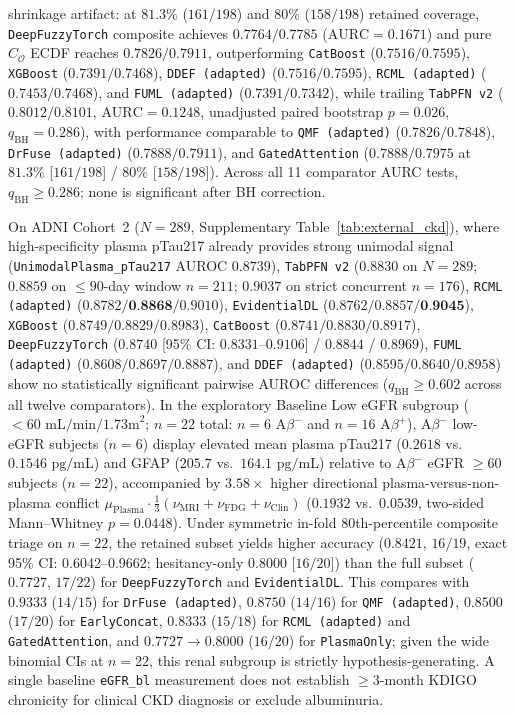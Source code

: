 \documentclass[10pt,twocolumn]{article}
\begin{document}
shrinkage artifact: at $81.3\%$ ($161/198$) and $80\%$ ($158/198$) retained coverage,
\texttt{DeepFuzzyTorch} composite achieves $0.7764 / 0.7785$ ($\text{AURC}=0.1671$) and pure
$C_{\mathcal{O}}$ ECDF reaches $0.7826 / 0.7911$, outperforming \texttt{CatBoost} ($0.7516 /
0.7595$), \texttt{XGBoost} ($0.7391 / 0.7468$), \texttt{DDEF (adapted)} ($0.7516 / 0.7595$),
\texttt{RCML (adapted)} ($0.7453 / 0.7468$), and \texttt{FUML (adapted)} ($0.7391 / 0.7342$),
while trailing
\texttt{TabPFN~v2} ($0.8012 / 0.8101$, $\text{AURC}=0.1248$, unadjusted paired bootstrap
$p=0.026$,
$q_{\text{BH}}=0.286$), with performance comparable to \texttt{QMF (adapted)}
($0.7826 / 0.7848$), \texttt{DrFuse (adapted)} ($0.7888 / 0.7911$), and
\texttt{GatedAttention} ($0.7888 / 0.7975$ at $81.3\%$ [$161/198$] / $80\%$ [$158/198$]).
Across all 11
comparator AURC tests, $q_{\text{BH}}\ge0.286$; none is significant after BH correction.

On ADNI Cohort~2 ($N=289$, Supplementary Table~\ref{tab:external_ckd}), where high-specificity
plasma pTau217
already provides strong unimodal signal (\texttt{UnimodalPlasma\_pTau217} AUROC $0.8739$),
\texttt{TabPFN~v2} ($0.8830$ on $N=289$; $0.8859$ on $\le 90$-day window $n=211$; $0.9037$ on
strict concurrent $n=176$), \texttt{RCML (adapted)} ($0.8782 / \textbf{0.8868} / 0.9010$),
\texttt{EvidentialDL} ($0.8762 / 0.8857 / \textbf{0.9045}$), \texttt{XGBoost} ($0.8749 / 0.8829
/
0.8983$), \texttt{CatBoost} ($0.8741 / 0.8830 / 0.8917$), \texttt{DeepFuzzyTorch} ($0.8740$
[95\% CI: $0.8331\text{--}0.9106$] / $0.8844$ / $0.8969$), \texttt{FUML (adapted)} ($0.8608 /
0.8697 / 0.8887$), and \texttt{DDEF (adapted)} ($0.8595 / 0.8640 / 0.8958$) show no
statistically
significant pairwise AUROC differences ($q_{\text{BH}} \ge 0.602$ across all twelve
comparators).
In the exploratory Baseline Low eGFR subgroup ($<60\text{ mL/min/1.73m}^2$; $n=22$ total:
$n=6$ A$\beta^-$ and $n=16$ A$\beta^+$), A$\beta^-$ low-eGFR subjects ($n=6$) display
elevated mean plasma pTau217 ($0.2618$ vs.\
$0.1546\text{ pg/mL}$) and GFAP ($205.7$ vs.\ $164.1\text{ pg/mL}$) relative to A$\beta^-$
eGFR $\ge 60$ subjects ($n=22$), accompanied by $3.58\times$ higher directional
plasma-versus-non-plasma conflict $\mu_{\text{Plasma}}\cdot
\frac{1}{3}(\nu_{\text{MRI}}+\nu_{\text{FDG}}+\nu_{\text{Clin}})$ ($0.1932$ vs.\ $0.0539$,
two-sided Mann--Whitney $p = 0.0448$). Under symmetric in-fold 80th-percentile composite triage
on $n=22$, the retained subset yields higher accuracy ($0.8421$, $16/19$, exact 95\%
CI: 0.6042--0.9662; hesitancy-only $0.8000$ [$16/20$]) than the full subset ($0.7727$,
$17/22$) for \texttt{DeepFuzzyTorch} and
\texttt{EvidentialDL}. This compares with $0.9333$ ($14/15$) for \texttt{DrFuse (adapted)},
$0.8750$ ($14/16$) for \texttt{QMF (adapted)}, $0.8500$ ($17/20$) for \texttt{EarlyConcat},
$0.8333$
($15/18$) for \texttt{RCML (adapted)} and \texttt{GatedAttention}, and $0.7727 \to 0.8000$
($16/20$) for \texttt{PlasmaOnly}; given the wide binomial CIs at $n=22$, this renal subgroup
is strictly hypothesis-generating. A single baseline \texttt{eGFR\_bl} measurement does not
establish $\ge 3$-month KDIGO chronicity for clinical CKD diagnosis or exclude albuminuria.
\end{document}

